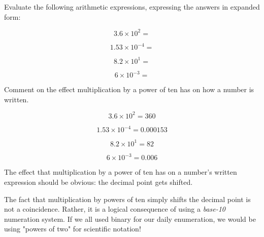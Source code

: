 

Evaluate the following arithmetic expressions, expressing the answers in expanded form:

$$3.6 \times 10^2 = $$

$$1.53 \times 10^{-4} = $$

$$8.2 \times 10^{1} = $$

$$6 \times 10^{-3} = $$

Comment on the effect multiplication by a power of ten has on how a number is written.







$$3.6 \times 10^2 = 360$$

$$1.53 \times 10^{-4} = 0.000153$$

$$8.2 \times 10^{1} = 82$$

$$6 \times 10^{-3} = 0.006$$

\vskip 10pt

The effect that multiplication by a power of ten has on a number's written expression should be obvious: the decimal point gets shifted.







The fact that multiplication by powers of ten simply shifts the decimal point is not a coincidence.  Rather, it is a logical consequence of using a {\it base-10} numeration system.  If we all used binary for our daily enumeration, we would be using "powers of two" for scientific notation!




